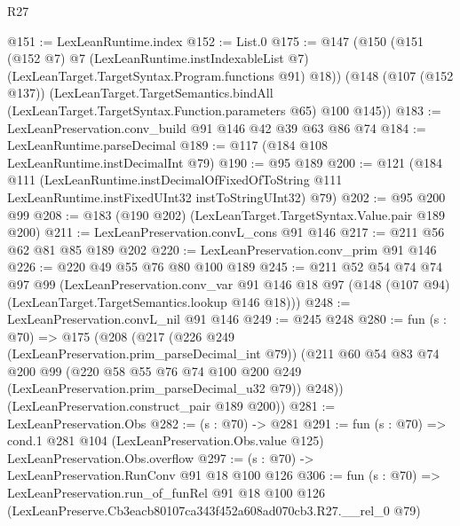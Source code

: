 \begin{lexlean}{R27}
\begin{coremodule}
@151 := LexLeanRuntime.index
@152 := List.{0}
@175 := @147
    (@150
      (@151
        (@152 @7)
        @7
        (LexLeanRuntime.instIndexableList @7)
        (LexLeanTarget.TargetSyntax.Program.functions @91)
        @18))
    (@148
      (@107 (@152 @137))
      (LexLeanTarget.TargetSemantics.bindAll
        (LexLeanTarget.TargetSyntax.Function.parameters @65)
        @100
        @145))
@183 := LexLeanPreservation.conv_build @91 @146 @42 @39 @63 @86 @74
@184 := LexLeanRuntime.parseDecimal
@189 := @117 (@184 @108 LexLeanRuntime.instDecimalInt @79)
@190 := @95 @189
@200 := @121
    (@184
      @111
      (LexLeanRuntime.instDecimalOfFixedOfToString
        @111
        LexLeanRuntime.instFixedUInt32
        instToStringUInt32)
      @79)
@202 := @95 @200 @99
@208 := @183 (@190 @202) (LexLeanTarget.TargetSyntax.Value.pair @189 @200)
@211 := LexLeanPreservation.convL_cons @91 @146
@217 := @211 @56 @62 @81 @85 @189 @202
@220 := LexLeanPreservation.conv_prim @91 @146
@226 := @220 @49 @55 @76 @80 @100 @189
@245 := @211
    @52
    @54
    @74
    @74
    @97
    @99
    (LexLeanPreservation.conv_var
      @91
      @146
      @18
      @97
      (@148 (@107 @94) (LexLeanTarget.TargetSemantics.lookup @146 @18)))
@248 := LexLeanPreservation.convL_nil @91 @146
@249 := @245 @248
@280 := fun (s : @70) =>
  @175
    (@208
      (@217
        (@226 @249 (LexLeanPreservation.prim_parseDecimal_int @79))
        (@211
          @60
          @54
          @83
          @74
          @200
          @99
          (@220 @58 @55 @76 @74 @100 @200 @249 (LexLeanPreservation.prim_parseDecimal_u32 @79))
          @248))
      (LexLeanPreservation.construct_pair @189 @200))
@281 := LexLeanPreservation.Obs
@282 := (s : @70) -> @281
@291 := fun (s : @70) =>
  cond.{1} @281 @104 (LexLeanPreservation.Obs.value @125) LexLeanPreservation.Obs.overflow
@297 := (s : @70) -> LexLeanPreservation.RunConv @91 @18 @100 @126
@306 := fun (s : @70) =>
  LexLeanPreservation.run_of_funRel
    @91
    @18
    @100
    @126
    (LexLeanPreserve.Cb3eacb80107ca343f452a608ad070cb3.R27.__rel_0 @79)
\end{coremodule}
\end{lexlean}
